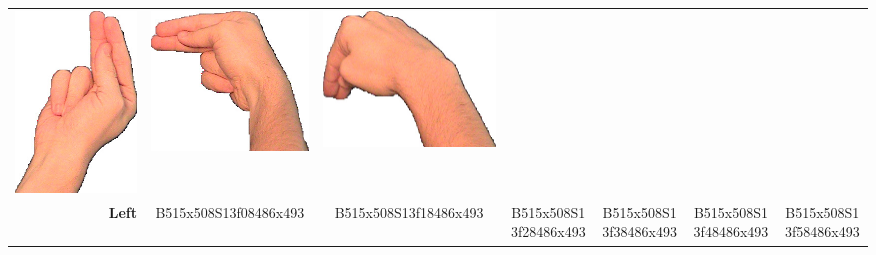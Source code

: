 \documentclass{article}
\begin{document}
\begin{center}
\begin{tabular}{r*{6}{c}}
\includegraphics[scale=0.1]{images/03-11-4.jpg}&
\includegraphics[scale=0.1]{images/03-11-5.jpg}&
\includegraphics[scale=0.1]{images/03-11-6.jpg}\\
\textbf{Left}&
B515x508S13f08486x493&
B515x508S13f18486x493&
B515x508S13f28486x493&
B515x508S13f38486x493&
B515x508S13f48486x493&
B515x508S13f58486x493\\
\end{tabular}
\end{center}
\end{document}
